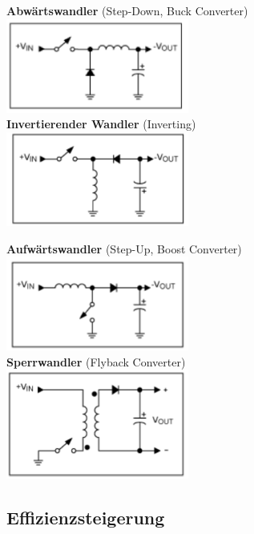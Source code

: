 		\begin{minipage}{8cm}
			\textbf{Abwärtswandler} (Step-Down, Buck Converter) \\
			\includegraphics[width=6cm]{images/buckConv} \\
			\textbf{Invertierender Wandler} (Inverting) \\
			\includegraphics[width=6cm]{images/invConv} \\
		\end{minipage}
		\begin{minipage}{8cm}
			\textbf{Aufwärtswandler} (Step-Up, Boost Converter) \\
			\includegraphics[width=6cm]{images/boostConv} \\
			\textbf{Sperrwandler} (Flyback Converter) \\
			\includegraphics[width=6cm]{images/flybackConv}
		\end{minipage}

\subsection{Effizienzsteigerung}
